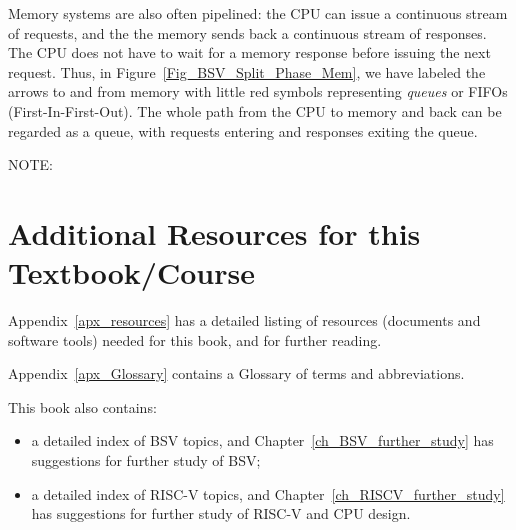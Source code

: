 Memory systems are also often pipelined: the CPU can issue a
continuous stream of requests, and the the memory sends back a
continuous stream of responses.  The CPU does not have to wait for a
memory response before issuing the next request.  Thus, in
Figure~\ref{Fig_BSV_Split_Phase_Mem}, we have labeled the arrows to
and from memory with little red symbols representing \emph{queues} or
FIFOs (First-In-First-Out).  The whole path from the CPU to memory and
back can be regarded as a queue, with requests entering and responses
exiting the queue.


\vspace{1ex}

NOTE: 

\vspace{1ex}



\section{Additional Resources for this Textbook/Course}

Appendix~\ref{apx_resources} has a detailed listing of resources
(documents and software tools) needed for this book, and for further
reading.

Appendix~\ref{apx_Glossary} contains a Glossary of terms and
abbreviations.

This book also contains:

\begin{itemize}

 \item a detailed index of BSV topics, and
       Chapter~\ref{ch_BSV_further_study} has suggestions for further
       study of BSV;

 \item a detailed index of RISC-V topics, and
       Chapter~\ref{ch_RISCV_further_study} has suggestions for
       further study of RISC-V and CPU design.

 \end{itemize}

